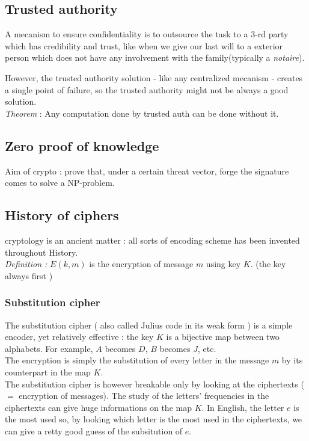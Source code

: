 \subsection{Trusted authority}

\noi A mecanism to ensure confidentiality is to outsource the task to a 3-rd party which has credibility and trust, like when we give our last will to a exterior person which does not have any involvement with the family(typically a \emph{notaire}).

\noi However, the trusted authority solution - like any centralized mecanism -  creates a single point of failure, so the trusted authority might not be always a good solution. \\

\emph{Theorem} : Any computation done by trusted auth can be done without it.\\


\subsection{ Zero proof of knowledge }
Aim of crypto : prove that, under a certain threat vector, forge the signature comes to solve a NP-problem.

\subsection{History of ciphers}

\noi cryptology is an ancient matter : all sorts of encoding scheme has been invented throughout History. \\
\emph{Definition :} $E(k,m)$ is the encryption of message $m$ using key $K$. (the key always first ) \\

\subsubsection{Substitution cipher }
The substitution cipher ( also called Julius code in its weak form ) is a simple encoder, yet relatively effective : the key $K$ is a bijective map between two alphabets. For example, $A$ becomes $D$, $B$ becomes $J$, etc.\\
The encryption is simply the substitution of every letter in the message $m$ by its counterpart in the map $K$.\\
The substitution cipher is however breakable only by looking at the ciphertexts ($=$ encryption of messages). The study of the letters' frequencies in the ciphertexts can give huge informations on the map $K$. In English, the letter $e$ is the most used so, by looking which letter is the most used in the ciphertexts, we can give a retty good guess of the subsitution of $e$.\\

